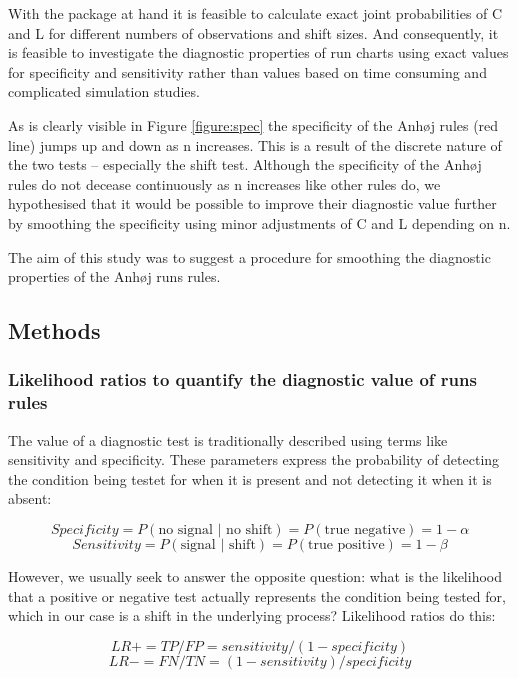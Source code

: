 With the  package at hand it is feasible to calculate
exact joint probabilities of C and L for different numbers of
observations and shift sizes. And consequently, it is feasible to
investigate the diagnostic properties of run charts using exact values
for specificity and sensitivity rather than values based on time
consuming and complicated simulation studies.

As is clearly visible in Figure \ref{figure:spec} the specificity of the
Anhøj rules (red line) jumps up and down as n increases. This is a
result of the discrete nature of the two tests -- especially the shift
test. Although the specificity of the Anhøj rules do not decease
continuously as n increases like other rules do, we hypothesised that it
would be possible to improve their diagnostic value further by smoothing
the specificity using minor adjustments of C and L depending on n.

The aim of this study was to suggest a procedure for smoothing the
diagnostic properties of the Anhøj runs rules.

\hypertarget{methods}{%
\subsection{Methods}\label{methods}}

\hypertarget{likelihood-ratios-to-quantify-the-diagnostic-value-of-runs-rules}{%
\subsubsection{Likelihood ratios to quantify the diagnostic value of
runs
rules}\label{likelihood-ratios-to-quantify-the-diagnostic-value-of-runs-rules}}

The value of a diagnostic test is traditionally described using terms
like sensitivity and specificity. These parameters express the
probability of detecting the condition being testet for when it is
present and not detecting it when it is absent:

\[ Specificity=P(\text{no signal | no shift})=P(\text{true negative})=1-\alpha \]
\[ Sensitivity=P(\text{signal | shift})=P(\text{true positive})=1-\beta \]

However, we usually seek to answer the opposite question: what is the
likelihood that a positive or negative test actually represents the
condition being tested for, which in our case is a shift in the
underlying process? Likelihood ratios do this:

\[ LR+=TP/FP=sensitivity/(1-specificity) \]
\[ LR-=FN/TN=(1-sensitivity)/specificity \]

